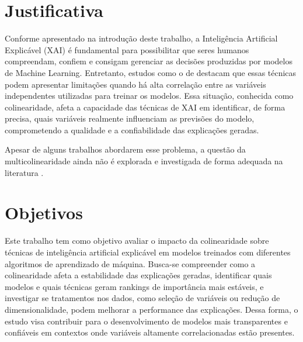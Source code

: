 \section{Justificativa}\label{sec:justificativa}
Conforme apresentado na introdução deste trabalho, a Inteligência Artificial Explicável (XAI) é fundamental para possibilitar que seres humanos compreendam, confiem e consigam gerenciar as decisões produzidas por modelos de Machine Learning. Entretanto, estudos como o de  destacam que essas técnicas podem apresentar limitações quando há alta correlação entre as variáveis independentes utilizadas para treinar os modelos. Essa situação, conhecida como colinearidade, afeta a capacidade das técnicas de XAI em identificar, de forma precisa, quais variáveis realmente influenciam as previsões do modelo, comprometendo a qualidade e a confiabilidade das explicações geradas. 

Apesar de alguns trabalhos abordarem esse problema, a questão da multicolinearidade ainda não é explorada e investigada de forma adequada na literatura \cite{Salih2024MiniReview}.



\section{Objetivos}\label{sec:objetivos}

Este trabalho tem como objetivo avaliar o impacto da colinearidade sobre técnicas de inteligência artificial explicável em modelos treinados com diferentes algoritmos de aprendizado de máquina. Busca-se compreender como a colinearidade afeta a estabilidade das explicações geradas, identificar quais modelos e quais técnicas geram rankings de importância mais estáveis, e investigar se tratamentos nos dados, como seleção de variáveis ou redução de dimensionalidade, podem melhorar a performance das explicações. Dessa forma, o estudo visa contribuir para o desenvolvimento de modelos mais transparentes e confiáveis em contextos onde variáveis altamente correlacionadas estão presentes.


